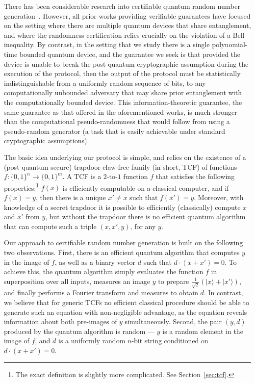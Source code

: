 \documentclass[11pt]{article}
\theoremstyle{remark}
\theoremstyle{definition}
\newcommand{\ket}[1]{|#1\rangle}
\begin{document}
There has been considerable research into certifiable quantum random number generation~\cite{Colbeck09,Pironio,FGS11,PM11,VV12,miller2016robust,bierhorst2018experimentally}. However, all prior works providing verifiable guarantees have focused on the setting where there are multiple quantum devices
that share entanglement, and where the randomness certification relies crucially on the violation of a Bell inequality. By contrast, in the setting that we study there is a single polynomial-time bounded quantum device, and the guarantee we seek is that provided the device is unable to break the post-quantum cryptographic assumption during the execution of the protocol, then the output 
of the protocol must be statistically indistinguishable from a uniformly random sequence of bits, to any computationally unbounded adversary that may share prior entanglement with the computationally bounded device. This information-theoretic guarantee, the same guarantee as that offered in the aforementioned works, is much stronger than the computational pseudo-randomness that would follow from using a pseudo-random generator (a task that is easily achievable under standard cryptographic assumptions). %

The basic idea underlying our protocol is simple, and relies on the existence of a (post-quantum secure) trapdoor claw-free family (in short, TCF) of functions $f:\{0,1\}^n \rightarrow \{0,1\}^m$.
A TCF is a $2$-to-$1$ function $f$ that satisfies the following properties:\footnote{The exact definition is slightly more complicated. See Section~\ref{sec:tcf}.} $f(x)$ is efficiently computable on a classical computer, and if $f(x) = y$, then there is a unique 
$x' \neq x$ such that $ f(x') = y$. Moreover, with knowledge of a secret trapdoor  it is possible to efficiently (classically) compute $x$ and $x'$ from $y$, but without the trapdoor there is no efficient 
quantum algorithm that can compute such a triple $(x, x', y)$, for any $y$.
 
Our approach to certifiable random number generation is built on the following two observations. First, there is an efficient quantum algorithm that 
computes $y$ in the image of $f$, as well as a binary vector $d$ such that  $d\cdot(x + x') = 0$. To achieve this, the quantum algorithm simply evaluates the function $f$ in superposition over all inputs, measures an image $y$ to prepare $\frac{1}{\sqrt{2}}(\ket{x}+\ket{x'})$, and finally performs a Fourier transform and measures to obtain $d$. In contrast, we 
believe that for generic TCFs no efficient classical procedure should be able to generate such an equation with non-negligible advantage, as the equation reveals information about both pre-images of $y$ simultaneously. Second, the pair $(y, d)$ produced by the quantum 
algorithm is random --- $y$ is a random element in the image of $f$, and $d$ is a uniformly random $n$-bit string conditioned on $d\cdot(x + x') = 0$.
\end{document}
